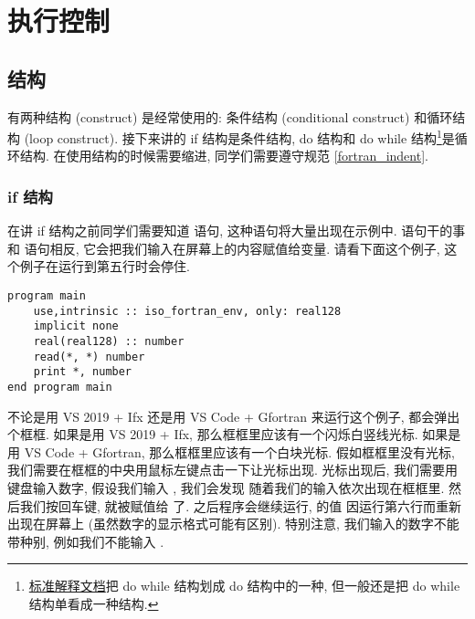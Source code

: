 \chapter{执行控制}

\section{结构}

有两种结构 (construct) 是经常使用的: 条件结构 (conditional construct) 和循环结构 (loop construct). 接下来讲的 if 结构是条件结构, do 结构和 do while 结构\footnote{\href{https://j3-fortran.org/doc/year/24/24-007.pdf}{标准解释文档}把 do while 结构划成 do 结构中的一种, 但一般还是把 do while 结构单看成一种结构.}是循环结构. 在使用结构的时候需要缩进, 同学们需要遵守规范 \ref{fortran_indent}.

\subsection{if 结构}\label{if_construct}

在讲 if 结构之前同学们需要知道  语句, 这种语句将大量出现在示例中.  语句干的事和  语句相反, 它会把我们输入在屏幕上的内容赋值给变量. 请看下面这个例子, 这个例子在运行到第五行时会停住.
\begin{lstlisting}
program main
    use,intrinsic :: iso_fortran_env, only: real128
    implicit none
    real(real128) :: number
    read(*, *) number
    print *, number
end program main
\end{lstlisting}
不论是用 VS 2019 + Ifx 还是用 VS Code + Gfortran 来运行这个例子, 都会弹出个框框. 如果是用 VS 2019 + Ifx, 那么框框里应该有一个闪烁白竖线光标. 如果是用 VS Code + Gfortran, 那么框框里应该有一个白块光标. 假如框框里没有光标, 我们需要在框框的中央用鼠标左键点击一下让光标出现. 光标出现后, 我们需要用键盘输入数字, 假设我们输入 , 我们会发现  随着我们的输入依次出现在框框里. 然后我们按回车键,  就被赋值给  了. 之后程序会继续运行,  的值  因运行第六行而重新出现在屏幕上 (虽然数字的显示格式可能有区别). 特别注意, 我们输入的数字不能带种别, 例如我们不能输入 .

